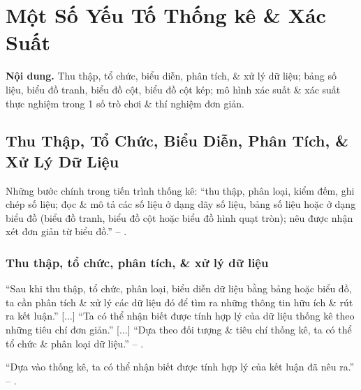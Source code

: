 \documentclass{article}
\numberwithin{equation}{section}
\begin{document}

\section{Một Số Yếu Tố Thống kê \& Xác Suất}
\textbf{Nội dung.} Thu thập, tổ chức, biểu diễn, phân tích, \& xử lý dữ liệu; bảng số liệu, biểu đồ tranh, biểu đồ cột, biểu đồ cột kép; mô hình xác suất \& xác suất thực nghiệm trong 1 số trò chơi \& thí nghiệm đơn giản.

\subsection{Thu Thập, Tổ Chức, Biểu Diễn, Phân Tích, \& Xử Lý Dữ Liệu}
Những bước chính trong tiến trình thống kê: ``thu thập, phân loại, kiểm đếm, ghi chép số liệu; đọc \& mô tả các số liệu ở dạng dãy số liệu, bảng số liệu hoặc ở dạng biểu đồ (biểu đồ tranh, biểu đồ cột hoặc biểu đồ hình quạt tròn); nêu được nhận xét đơn giản từ biểu đồ.'' -- \cite[p. 3]{Thai_Anh_Dat_Ha_Loan_Nam_Quang_Toan_6_tap_2}.

\subsubsection{Thu thập, tổ chức, phân tích, \& xử lý dữ liệu}
``Sau khi thu thập, tổ chức, phân loại, biểu diễn dữ liệu bằng bảng hoặc biểu đồ, ta cần phân tích \& xử lý các dữ liệu đó để tìm ra những thông tin hữu ích \& rút ra kết luận.'' [$\ldots$] ``Ta có thể nhận biết được tính hợp lý của dữ liệu thống kê theo những tiêu chí đơn giản.'' [$\ldots$] ``Dựa theo đối tượng \& tiêu chí thống kê, ta có thể tổ chức \& phân loại dữ liệu.'' -- \cite[p. 4]{Thai_Anh_Dat_Ha_Loan_Nam_Quang_Toan_6_tap_2}.

``Dựa vào thống kê, ta có thể nhận biết được tính hợp lý của kết luận đã nêu ra.'' -- \cite[p. 5]{Thai_Anh_Dat_Ha_Loan_Nam_Quang_Toan_6_tap_2}.
\end{document}
